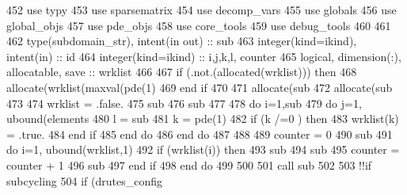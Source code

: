 \begin{DoxyCode}
452       \textcolor{keywordtype}{use }typy
453       \textcolor{keywordtype}{use }sparsematrix
454       \textcolor{keywordtype}{use }decomp_vars
455       \textcolor{keywordtype}{use }globals
456       \textcolor{keywordtype}{use }global_objs
457       \textcolor{keywordtype}{use }pde_objs
458       \textcolor{keywordtype}{use }core_tools
459       \textcolor{keywordtype}{use }debug_tools
460 
461       
462       \textcolor{keywordtype}{type}(subdomain_str), \textcolor{keywordtype}{intent(in out)} :: sub
463       \textcolor{keywordtype}{integer(kind=ikind)}, \textcolor{keywordtype}{intent(in)} :: id
464       \textcolor{keywordtype}{integer(kind=ikind)} :: i,j,k,l, counter
465       \textcolor{keywordtype}{logical}, \textcolor{keywordtype}{dimension(:)}, \textcolor{keywordtype}{allocatable}, \textcolor{keywordtype}{save} :: wrklist
466     
467       \textcolor{keywordflow}{if} (.not.(\textcolor{keyword}{allocated}(wrklist))) \textcolor{keywordflow}{then}
468         \textcolor{keyword}{allocate}(wrklist(maxval(pde(1)%
469 \textcolor{keywordflow}{      end if}
470       
471       \textcolor{keyword}{allocate}(sub%
472       \textcolor{keyword}{allocate}(sub%
473       
474       wrklist = .false.
475       sub%
476       sub%
477       
478       \textcolor{keywordflow}{do} i=1,sub%
479         \textcolor{keywordflow}{do} j=1, ubound(elements%
480           l = sub%
481           k = pde(1)%
482           \textcolor{keywordflow}{if} (k /=0 ) \textcolor{keywordflow}{then}
483             wrklist(k) = .true.
484 \textcolor{keywordflow}{          end if}
485 \textcolor{keywordflow}{        end do}
486 \textcolor{keywordflow}{      end do}
487       
488       
489       counter = 0
490       sub%
491       \textcolor{keywordflow}{do} i=1, ubound(wrklist,1)
492         \textcolor{keywordflow}{if} (wrklist(i)) \textcolor{keywordflow}{then}
493           sub%
494           sub%
495           counter = counter + 1
496           sub%
497 \textcolor{keywordflow}{        end if}
498 \textcolor{keywordflow}{      end do}
499       
500 
501       \textcolor{keyword}{call }sub%
502       
503       \textcolor{comment}{!!if subcycling      }
504       \textcolor{keywordflow}{if} (drutes_config%

\end{DoxyCode}
